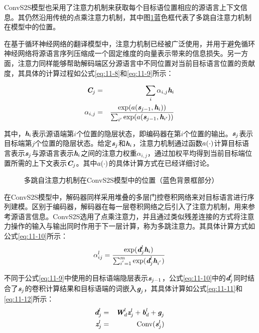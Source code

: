 \parinterval ConvS2S模型也采用了注意力机制来获取每个目标语位置相应的源语言上下文信息。其仍然沿用传统的点乘注意力机制，其中图\ref{fig:11-16}蓝色框代表了多跳自注意力机制在模型中的位置。

\parinterval 在基于循环神经网络的翻译模型中，注意力机制已经被广泛使用，并用于避免循环神经网络将源语言序列压缩成一个固定维度的向量表示带来的信息损失。另一方面，注意力同样能够帮助解码端区分源语言中不同位置对当前目标语言位置的贡献度，其具体的计算过程如公式\eqref{eq:11-8}和\eqref{eq:11-9}所示：

\begin{eqnarray}
\textbf{\em C}_j &=& \sum_i \alpha_{i,j} \textbf{\em h}_i \label{eq:11-8} \\
\alpha_{i,j} &=& \frac{ \textrm{exp}({a} (\textbf{\em s}_{j-1},\textbf{\em h}_i))  }{\sum_{i'} \textrm{exp}( {a} (\textbf{\em s}_{j-1},\textbf{\em h}_{i'}))} \label{eq:11-9}
\end{eqnarray}

\noindent 其中，$\textbf{\em h}_i$表示源语端第$i$个位置的隐层状态，即编码器在第$i$个位置的输出。$\textbf{\em s}_j$表示目标端第$j$个位置的隐层状态。给定$\textbf{\em s}_j$和$\textbf{\em h}_i$，注意力机制通过函数${a}(\cdot)$计算目标语言表示$\textbf{\em s}_j$与源语言表示$\textbf{\em h}_i$之间的注意力权重$\alpha_{i,j}$，通过加权平均得到当前目标端位置所需的上下文表示$\textbf{\em C}_j$。其中${a}(\cdot)$的具体计算方式在{\chapterten}已经详细讨论。

\begin{figure}[htp]
\centering

\caption{多跳自注意力机制在ConvS2S模型中的位置（蓝色背景框部分）}
\label{fig:11-16}
\end{figure}

\parinterval 在ConvS2S模型中，解码器同样采用堆叠的多层门控卷积网络来对目标语言进行序列建模。区别于编码器，解码器在每一层卷积网络之后引入了注意力机制，用来参考源语言信息。ConvS2S选用了点乘注意力，并且通过类似残差连接的方式将注意力操作的输入与输出同时作用于下一层计算，称为多跳注意力。其具体计算方式如公式\eqref{eq:11-10}所示：
\begin{eqnarray}
\alpha_{ij}^l = \frac{ \textrm{exp} (\textbf{\em d}_{j}^l\textbf{\em h}_i) }{\sum_{i^{'}=1}^m \textrm{exp} (\textbf{\em d}_{j}^l\textbf{\em h}_{i^{'}})}
\label{eq:11-10}
\end{eqnarray}

\noindent 不同于公式\eqref{eq:11-9}中使用的目标语端隐层表示$\textbf{\em s}_{j-1}$，公式\eqref{eq:11-10}中的$\textbf{\em d}_{j}^l$同时结合了$\textbf{\em s}_{j}$的卷积计算结果和目标语端的词嵌入$\textbf{\em g}_j$，其具体计算如公式\eqref{eq:11-11}和\eqref{eq:11-12}所示：
\begin{eqnarray}
\textbf{\em d}_{j}^l &=& \textbf{\em W}_{d}^{l} \textbf{\em z}_{j}^{l} + \textbf{\em b}_{d}^{l} + \textbf{\em g}_j \label{eq:11-11} \\
\textbf{\em z}_j^l &=& \textrm{Conv}(\textbf{\em s}_j^l) \label{eq:11-12}
\end{eqnarray}

